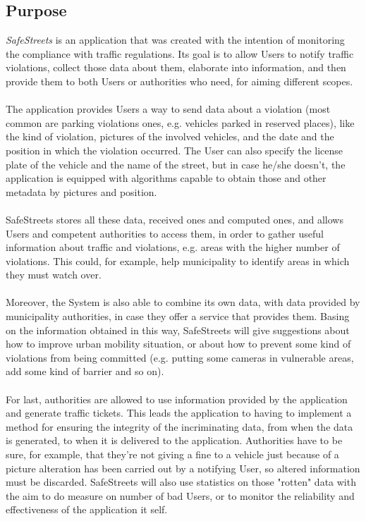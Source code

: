 \subsection{Purpose}
\textit{SafeStreets} is an application that was created with the intention of monitoring the compliance with traffic regulations. Its goal is to allow Users to notify traffic violations, collect those data about them, elaborate into information, and then provide them to both Users or authorities who need, for aiming different scopes. \\ \\
The application provides Users a way to send data about a violation (most common are parking violations ones, e.g. vehicles parked in reserved places), like the kind of violation, pictures of the involved vehicles, and the date and the position in which the violation occurred. The User can also specify the license plate of the vehicle and the name of the street, but in case he/she doesn't, the application is equipped with algorithms capable to obtain those and other metadata by pictures and position.\\\\
SafeStreets stores all these data, received ones and computed ones, and allows Users and competent authorities to access them, in order to gather useful information about traffic and violations, e.g. areas with the higher number of violations. This could, for example, help municipality to identify areas in which they must watch over.\\\\
Moreover, the System is also able to combine its own data, with data provided by municipality authorities, in case they offer a service that provides them. Basing on the information obtained in this way, SafeStreets will give suggestions about how to improve urban mobility situation, or about how to prevent some kind of violations from being committed (e.g. putting some cameras in vulnerable areas, add some kind of barrier and so on).\\\\
For last, authorities are allowed to use information provided by the application and generate traffic tickets. This leads the application to having to implement a method for ensuring the integrity of the incriminating data, from when the data is generated, to when it is delivered to the application. Authorities have to be sure, for example, that they're not giving a fine to a vehicle just because of a picture alteration has been carried out by a notifying User, so altered information must be discarded. SafeStreets will also use statistics on those "rotten" data with the aim to do measure on number of bad Users, or to monitor the reliability and effectiveness of the application it self. \\\\

